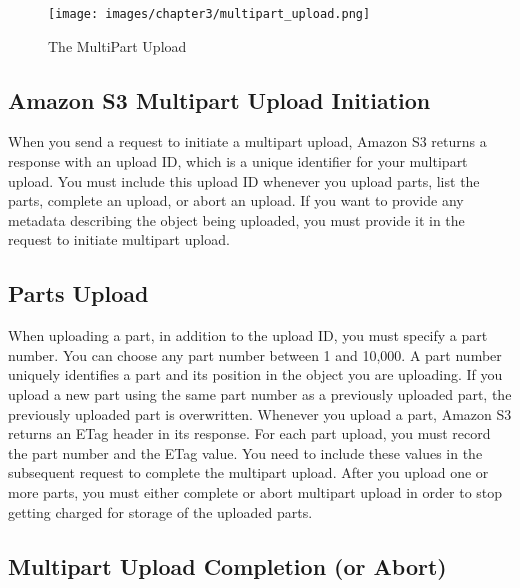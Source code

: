\begin{figure}[htb] %
 \centering
 \texttt{[image: images/chapter3/multipart\_upload.png]}\hfill
 \caption[Multi part Upload]{The MultiPart Upload}
 \label{fig:fourV}
\end{figure}

\subsection{Amazon S3 Multipart Upload Initiation}
\label{subsec:amazon_S3_multipart_upload_initiation}

When you send a request to initiate a multipart upload, Amazon S3 returns a response with an upload ID, which is a unique identifier for your multipart upload. You must include this upload ID whenever you upload parts, list the parts, complete an upload, or abort an upload. If you want to provide any metadata describing the object being uploaded, you must provide it in the request to initiate multipart upload.


\subsection{Parts Upload}
\label{subsec:parts_upload}

When uploading a part, in addition to the upload ID, you must specify a part number. You can choose any part number between 1 and 10,000. A part number uniquely identifies a part and its position in the object you are uploading. If you upload a new part using the same part number as a previously uploaded part, the previously uploaded part is overwritten. Whenever you upload a part, Amazon S3 returns an ETag header in its response. For each part upload, you must record the part number and the ETag value. You need to include these values in the subsequent request to complete the multipart upload.
After you upload one or more parts, you must either complete or abort multipart upload in order to stop getting charged for storage of the uploaded parts. 


\subsection{Multipart Upload Completion (or Abort)}
\label{subsec:multipart_upload_completion}

